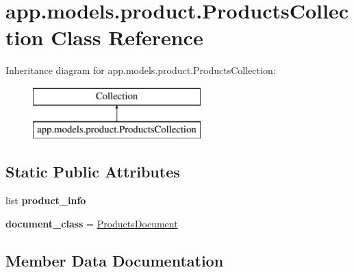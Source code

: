 \hypertarget{classapp_1_1models_1_1product_1_1_products_collection}{}\section{app.\+models.\+product.\+Products\+Collection Class Reference}
\label{classapp_1_1models_1_1product_1_1_products_collection}
Inheritance diagram for app.\+models.\+product.\+Products\+Collection\+:\begin{figure}[H]
\begin{center}
\leavevmode
\includegraphics[height=2.000000cm]{classapp_1_1models_1_1product_1_1_products_collection}
\end{center}
\end{figure}
\subsection*{Static Public Attributes}
\begin{DoxyCompactItemize}
\item 
list {\bfseries product\+\_\+info}
\item 
\mbox{\label{classapp_1_1models_1_1product_1_1_products_collection_ac42194e4bc44bf761922dba00a8f07d6}} 
{\bfseries document\+\_\+class} = \hyperlink{classapp_1_1models_1_1product_1_1_products_document}{Products\+Document}
\end{DoxyCompactItemize}


\subsection{Member Data Documentation}
\mbox{\label{classapp_1_1models_1_1product_1_1_products_collection_a1798226e48f141afe5d0fda66d4f4eff}} 
